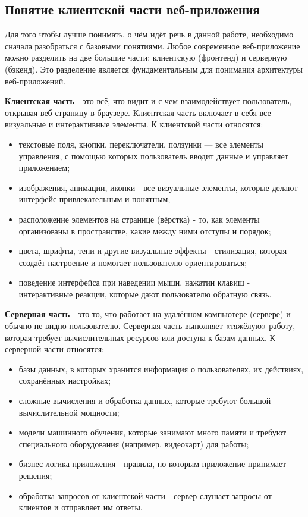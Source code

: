 \documentclass[14pt, a4paper]{extarticle}
\begin{document}
\begin{enumerate}
\subsection{Понятие клиентской части веб-приложения}

\noindent Для того чтобы лучше понимать, о чём идёт речь в данной работе, необходимо сначала разобраться с базовыми понятиями. Любое современное веб-приложение можно разделить на две большие части: клиентскую (фронтенд) и серверную (бэкенд). Это разделение является фундаментальным для понимания архитектуры веб-приложений.

\medskip
\noindent \textbf{Клиентская часть} - это всё, что видит и с чем взаимодействует пользователь, открывая веб-страницу в браузере. Клиентская часть включает в себя все визуальные и интерактивные элементы. К клиентской части относятся:

\begin{itemize}
\item текстовые поля, кнопки, переключатели, ползунки — все элементы управления, с помощью которых пользователь вводит данные и управляет приложением;
\item изображения, анимации, иконки - все визуальные элементы, которые делают интерфейс привлекательным и понятным;
\item расположение элементов на странице (вёрстка) - то, как элементы организованы в пространстве, какие между ними отступы и порядок;
\item цвета, шрифты, тени и другие визуальные эффекты - стилизация, которая создаёт настроение и помогает пользователю ориентироваться;
\item поведение интерфейса при наведении мыши, нажатии клавиш - интерактивные реакции, которые дают пользователю обратную связь.
\end{itemize}
\vskip 5cm
\noindent \textbf{Серверная часть} - это то, что работает на удалённом компьютере (сервере) и обычно не видно пользователю. Серверная часть выполняет «тяжёлую» работу, которая требует вычислительных ресурсов или доступа к базам данных. К серверной части относятся:

\begin{itemize}
\item базы данных, в которых хранится информация о пользователях, их действиях, сохранённых настройках;
\item сложные вычисления и обработка данных, которые требуют большой
вычислительной мощности;
\item модели машинного обучения, которые занимают много памяти и требуют специального оборудования (например, видеокарт) для работы;
\item бизнес-логика приложения - правила, по которым приложение принимает решения;
\item обработка запросов от клиентской части - сервер слушает запросы от клиентов и отправляет им ответы.
\end{itemize}


\end{enumerate}
\end{document}
